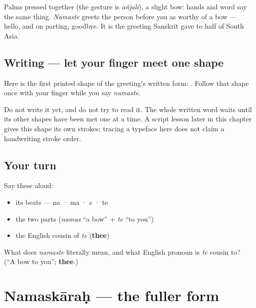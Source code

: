 \begin{culture}
Palms pressed together (the gesture is \emph{añjali}), a slight bow: hands and word say the same thing. \emph{Namaste} greets the person before you as worthy of a bow — hello, and on parting, goodbye. It is the greeting Sanskrit gave to half of South Asia.
\end{culture}

\subsection*{Writing — let your finger meet one shape}
Here is the first printed shape of the greeting's written form: \textbf{}. Follow that shape once with your finger while you say \emph{namaste}.

Do not write it yet, and do not try to read it. The whole written word waits until its other shapes have been met one at a time. A script lesson later in this chapter gives this shape its own strokes; tracing a typeface here does not claim a handwriting stroke order.

\subsection*{Your turn}
Say these aloud:

\begin{itemize}
\raggedright
  \item its beats — na · ma · s · te
  \item the two parts (\emph{namas} \textquotedblleft{}a bow\textquotedblright{} + \emph{te} \textquotedblleft{}to you\textquotedblright{})
  \item the English cousin of \emph{te} (\textbf{thee})
\end{itemize}

\begin{tcolorbox}[breakable,colback=teal!4,colframe=teal!35!black,title={Before you move on}]
What does \emph{namaste} literally mean, and what English pronoun is \emph{te} cousin to? (\textquotedblleft{}A bow to you\textquotedblright{}; \textbf{thee}.)
\end{tcolorbox}
\section[\texorpdfstring{\sk{नमस्कारः} (namaskāraḥ)}{नमस्कारः (namaskāraḥ)}]{Namaskāraḥ — the fuller form}

\label{lesson:SA-C01-namaskara}



